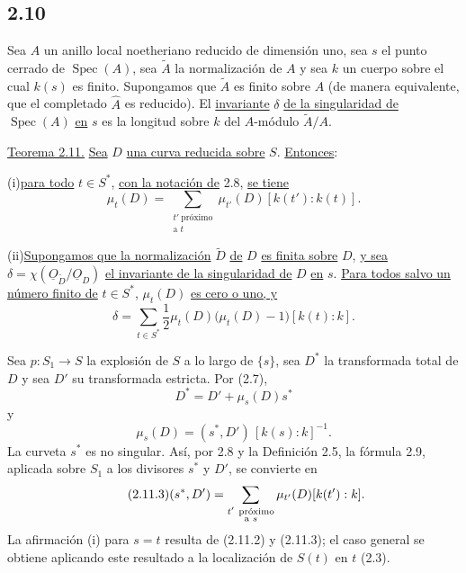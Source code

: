 \subsection*{2.10}
Sea $A$ un anillo local noetheriano reducido de dimensión uno, sea $s$ el punto
cerrado de $\operatorname{Spec}(A)$, sea $\widetilde A$ la normalización de $A$ y
sea $k$ un cuerpo sobre el cual $k(s)$ es finito. Supongamos que $\widetilde A$
es finito sobre $A$ (de manera equivalente, que el completado $\widehat A$ es
reducido). El \underline{invariante} $\delta$ \underline{de la singularidad de}
$\operatorname{Spec}(A)$ \underline{en} $s$ es la longitud sobre $k$ del
$A$-módulo $\widetilde A/A$.

\pageoriginale

\medskip
\noindent\underline{Teorema 2.11.}
\underline{Sea} $D$ \underline{una curva reducida sobre} $S$.
\underline{Entonces}:

\medskip
\noindent (i)\quad \underline{para todo} $t\in S^*$, \underline{con la notación
de} 2.8, \underline{se tiene}
\begin{equation*}
\mu_t(D)=
\sum_{\substack{t'\ \text{próximo}\\\text{a }t}}
\mu_{t'}(D)[k(t'):k(t)].
\end{equation*}

\noindent (ii)\quad \underline{Supongamos que la normalización} $\widetilde D$
\underline{de} $D$ \underline{es finita sobre} $D$, \underline{y sea}
$\delta=\chi(\underline{O}_{\widetilde D}/\underline{O}_D)$
\underline{el invariante de la singularidad de} $D$ \underline{en} $s$.
\underline{Para todos salvo un número finito de} $t\in S^*$,
$\mu_t(D)$ \underline{es cero o uno, y}
\begin{equation*}
\delta=\sum_{t\in S^*}\frac12\mu_t(D)
\bigl(\mu_t(D)-1\bigr)[k(t):k].
\end{equation*}

Sea $p:S_1\longrightarrow S$ la explosión de $S$ a lo largo de $\{s\}$, sea
$D^*$ la transformada total de $D$ y sea $D'$ su transformada estricta. Por
(2.7),
\begin{equation}\tag{2.11.1}
D^*=D'+\mu_s(D)s^*
\end{equation}
y
\begin{equation}\tag{2.11.2}
\mu_s(D)=(s^*,D')\,[k(s):k]^{-1}.
\end{equation}
La curveta $s^*$ es no singular. Así, por 2.8 y la Definición 2.5, la fórmula
2.9, aplicada sobre $S_1$ a los divisores $s^*$ y $D'$, se convierte en
\begin{equation}\tag{2.11.3}
(s^*,\sisi{D}{D'})=
\sum_{\substack{t'\ \text{próximo}\\\text{a }s}}
\mu_{t'}(D)[k(t'):k].
\end{equation}
La afirmación (i) para $s=t$ resulta de (2.11.2) y (2.11.3); el caso general se
obtiene aplicando este resultado a la localización de $S(t)$ en $t$ (2.3).

